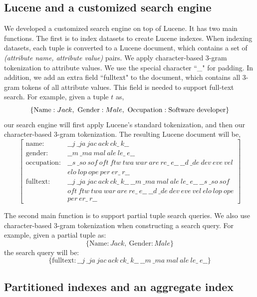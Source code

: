 \documentclass[conference]{IEEEtran}
\begin{document}
\subsection{Lucene and a customized search engine}
We developed a customized search engine on top of Lucene. It has two main functions. The first is to index datasets to create Lucene indexes. 
When indexing datasets, each tuple is converted to a Lucene document, which contains a set of \emph{(attribute name, attribute value)} pairs. We apply character-based 3-gram tokenization to attribute values. We use the special character ``\_" for padding. In addition, we add an extra field ``fulltext" to the document, which contains all 3-gram tokens of all attribute values. This field is needed to support full-text search.
For example, given a tuple $t$ as, 
$$
\{\mathrm{Name}:Jack,\ \mathrm{Gender}:Male,\ \mathrm{Occupation}:\makebox{Software developer}\}
$$
our search engine will first apply Lucene's standard tokenization, and then our character-based 3-gram tokenization. The resulting Lucene document will be,
$$
\left[\begin{array}{rl}
\mathrm{name}: & \_\_j\ \_ja\ jac\ ack\ ck\_\ k\_\_ \\
\mathrm{gender}: & \_\_m\ \_ma\ mal\ ale\ le\_\ e\_\_ \\
\mathrm{occupation}: & \_\_s\ \_so\ sof\ oft\ ftw\ twa\ war\ are\ re\_\ e\_\_\ \_\_d\ \_de\ dev\ eve\ vel \\
& elo\ lop\ ope\ per\ er\_\ r\_\_ \\
\mathrm{fulltext}: & \_\_j\ \_ja\ jac\ ack\ ck\_\ k\_\_\ \_\_m\ \_ma\ mal\ ale\ le\_\ e\_\_\ \_\_s\ \_so\ sof \\
& oft\ ftw\ twa\ war\ are\ re\_\ e\_\_\ \_\_d\ \_de\ dev\ eve\ vel\ elo\ lop\ ope \\
& per\ er\_\ r\_\_
\end{array}\right]
$$

The second main function is to support partial tuple search queries. We also use character-based 3-gram tokenization when constructing a search query. For example, given a partial tuple as:
$$
\{\mathrm{Name}:Jack,\ \mathrm{Gender}:Male\}
$$
the search query will be:
$$
\{\mathrm{fulltext}: \_\_j\ \_ja\ jac\ ack\ ck\_\ k\_\_\ \_\_m\ \_ma\ mal\ ale\ le\_\ e\_\_\}
$$

\subsection{Partitioned indexes and an aggregate index}
\end{document}
